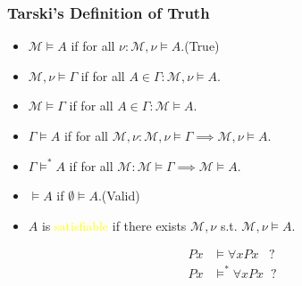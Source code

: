 \documentclass[UTF8,aspectratio=43,11pt,colorlinks,compress,openany]{beamer}%
\begin{document}
\begin{frame}\frametitle{Tarski's Definition of Truth}
		\begin{block}{}
			\begin{itemize}
				\item $\mathcal{M}\vDash A$ if for all $\nu:\mathcal{M},\nu\vDash A$.\hfill (True)
				\item $\mathcal{M},\nu\vDash\Gamma$ if for all $A\in\Gamma: \mathcal{M},\nu\vDash A$.
				\item $\mathcal{M}\vDash\Gamma$ if for all $A\in\Gamma:\mathcal{M}\vDash A$.
				\item $\Gamma\vDash A$ if for all $\mathcal{M},\nu: \mathcal{M},\nu\vDash\Gamma\implies\mathcal{M},\nu\vDash A$.
				\item $\Gamma\vDash^* A$ if for all $\mathcal{M}:\mathcal{M}\vDash\Gamma\implies\mathcal{M}\vDash A$.
				\item $\vDash A$ if $\emptyset\vDash A$.\hfill (Valid)
				\item $A$ is \textcolor{yellow}{satisfiable} if there exists $\mathcal{M},\nu$ s.t. $\mathcal{M},\nu\vDash A$.
			\end{itemize}
		\end{block}
\begin{align*}
Px&\vDash\forall xPx\;\;\;?\\
Px&\vDash^*\forall xPx\;\;?
\end{align*}
\end{frame}
\end{document}
